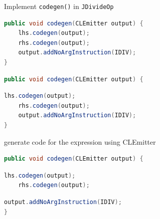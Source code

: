\documentclass[8pt,a4paper,compress]{beamer}
\begin{document}
\begin{frame}[fragile]
\pause

Implement \lstinline{codegen()} in \lstinline{JDivideOp}

\smallskip

\begin{overprint}

\begin{tcolorbox}[enhanced,drop shadow southwest,sharp corners,size=fbox,colback=white,fontlower=\small\ttfamily,collower=silver900]

\begin{lstlisting}[language=Java,style=focusin]
public void codegen(CLEmitter output) {
    lhs.codegen(output);
    rhs.codegen(output);
    output.addNoArgInstruction(IDIV);
}
\end{lstlisting}

\tcblower
\begin{minipage}[t][.2cm][t]{\textwidth}

\end{minipage}
\end{tcolorbox}

\begin{tcolorbox}[enhanced,drop shadow southwest,sharp corners,size=fbox,colback=white,fontlower=\small\ttfamily,collower=silver900]

\begin{lstlisting}[language=Java,style=focusin,backgroundcolor=\color{lime100}]
public void codegen(CLEmitter output) {
\end{lstlisting}
\begin{lstlisting}[language=Java,style=focusout]
    lhs.codegen(output);
    rhs.codegen(output);
    output.addNoArgInstruction(IDIV);
}
\end{lstlisting}

\tcblower
\begin{minipage}[t][.2cm][t]{\textwidth}
generate code for the expression using CLEmitter
\end{minipage}
\end{tcolorbox}

\begin{tcolorbox}[enhanced,drop shadow southwest,sharp corners,size=fbox,colback=white,fontlower=\small\ttfamily,collower=silver900]

\begin{lstlisting}[language=Java,style=focusout]
public void codegen(CLEmitter output) {
\end{lstlisting}
\begin{lstlisting}[language=Java,style=focusin,backgroundcolor=\color{lime100}]
    lhs.codegen(output);
    rhs.codegen(output);
\end{lstlisting}
\begin{lstlisting}[language=Java,style=focusout]
    output.addNoArgInstruction(IDIV);
}
\end{lstlisting}


\end{tcolorbox}
\end{overprint}
\end{frame}
\end{document}
